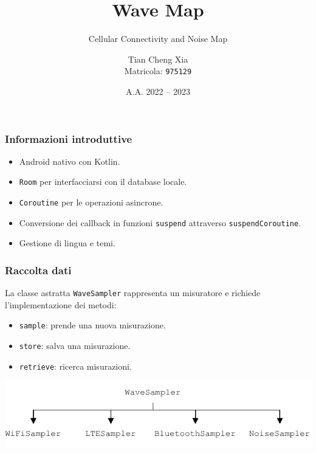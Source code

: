 \documentclass{beamer}
\begin{document}
\title{Wave Map}
\subtitle{Cellular Connectivity and Noise Map}
\author{Tian Cheng Xia\\Matricola: \texttt{975129}}
\date{A.A. 2022 -- 2023}

\begin{frame}
    \maketitle
\end{frame}


\begin{frame}
    \frametitle{Informazioni introduttive}

    \begin{itemize}
        \item Android nativo con Kotlin.
        \item \texttt{Room} per interfacciarsi con il database locale.
        \item \texttt{Coroutine} per le operazioni asincrone.
        \item Conversione dei callback in funzioni \texttt{suspend} attraverso \texttt{suspendCoroutine}.
        \item Gestione di lingua e temi.
    \end{itemize}
\end{frame}


\begin{frame}
    \frametitle{Raccolta dati}

    La classe astratta \texttt{WaveSampler} rappresenta un misuratore e richiede l'implementazione dei metodi:
    \begin{itemize}
        \item \texttt{sample}: prende una nuova misurazione.
        \item \texttt{store}: salva una misurazione.
        \item \texttt{retrieve}: ricerca misurazioni.
    \end{itemize}

    \includegraphics[width=\linewidth]{./img/sampler.pdf}
\end{frame}
\end{document}
